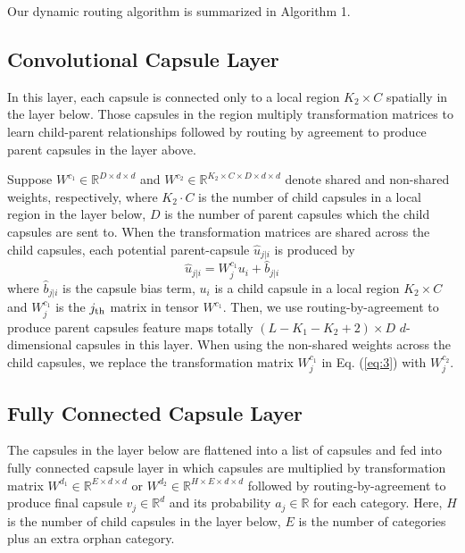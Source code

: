 \documentclass[11pt]{article}
\begin{document}
Our dynamic routing algorithm is summarized in Algorithm 1.









\subsection{Convolutional Capsule Layer}
In this layer, each capsule is connected only to a local region $K_2 \times C$ spatially in the layer below. Those capsules in the region multiply transformation matrices to learn child-parent relationships followed by routing by agreement to produce parent capsules in the layer above. 




Suppose $W^{c_{1}}\in\mathbb{R}^{D\times d\times d}$ and $W^{c_{2}} \in \mathbb{R}^{K_2 \times C\times D\times d\times d}$ denote shared and non-shared weights, respectively, where $K_2\cdot C$ is the number of child capsules in a local region in the layer below, $D$ is the number of parent capsules which the child capsules are sent to. When the transformation matrices are shared across the child capsules, each potential parent-capsule $\hat{u}_{j|i}$ is produced by
\begin{equation}
\label{eq:3}
\hat{u}_{j|i}=W_{j}^{c_{1}}u_{i}+\hat{b}_{j|i}
\end{equation}
where $\hat{b}_{j|i}$ is the capsule bias term, $u_{i}$ is a child capsule in a local region $K_2 \times C$ and $W_j^{c_1} $ is the $j_{\rm{th}}$ matrix in tensor $W^{c_{1}}$. Then, we use routing-by-agreement to produce parent capsules feature maps totally $(L-K_1-K_2+2)\times D $ $d$-dimensional capsules in this layer.
When using the non-shared weights across the child capsules, we replace the transformation matrix $W_j^{c_{1}}$ in Eq. (\ref{eq:3}) with $W_j^{c_{2}}$.




















\subsection{Fully Connected Capsule Layer}
The capsules in the layer below are flattened into a list of capsules and fed into fully connected capsule layer in which capsules are multiplied by transformation matrix $W^{d_{1}} \in \mathbb{R}^{E \times d \times d}$ or $W^{d_{2}} \in \mathbb{R}^{H\times E \times d \times d}$ followed by routing-by-agreement to produce final capsule $v_{j}\in \mathbb{R}^{d}$ and its probability $a_{j} \in \mathbb{R}$ for each category. Here, $H$ is the number of child capsules in the layer below, $E$ is the number of categories plus an extra orphan category.
\end{document}
